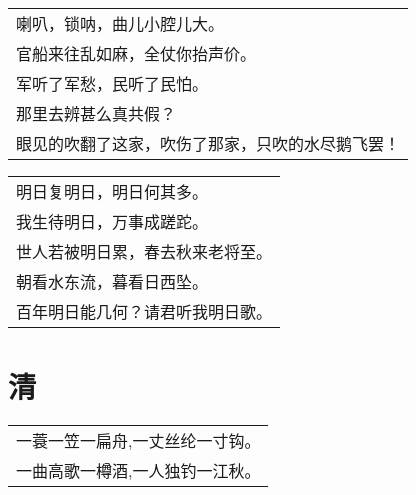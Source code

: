 \nopagebreak%
\nopagebreak%
\noindent\begin{minipage}{\linewidth}
  \vskip-3pt\begin{table}[H]
    \centering
    \begin{tabular}{@{}l@{}}
喇叭，锁呐，曲儿小腔儿大。\\
官船来往乱如麻，全仗你抬声价。\\
军听了军愁，民听了民怕。\\
那里去辨甚么真共假？\\
眼见的吹翻了这家，吹伤了那家，只吹的水尽鹅飞罢！
    \end{tabular}
  \end{table}
\end{minipage}
\vspace{1cm}


\nopagebreak%
\nopagebreak%
\noindent\begin{minipage}{\linewidth}
  \vskip-3pt\begin{table}[H]
    \centering
    \begin{tabular}{@{}l@{}}
明日复明日，明日何其多。\\
我生待明日，万事成蹉跎。\\
世人若被明日累，春去秋来老将至。\\
朝看水东流，暮看日西坠。\\
百年明日能几何？请君听我明日歌。
    \end{tabular}
  \end{table}
\end{minipage}
\vspace{1cm}


\chapter{清}
\nopagebreak%
\nopagebreak%
\noindent\begin{minipage}{\linewidth}
  \vskip-3pt\begin{table}[H]
    \centering
    \begin{tabular}{@{}l@{}}
一蓑一笠一扁舟,一丈丝纶一寸钩。\\
一曲高歌一樽酒,一人独钓一江秋。
    \end{tabular}
  \end{table}
\end{minipage}
\vspace{1cm}


